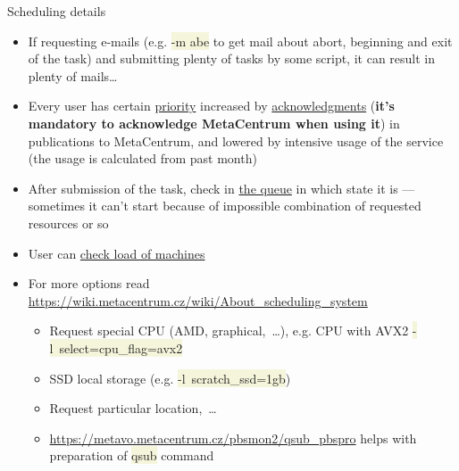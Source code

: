 \documentclass[compress, ucs, xelatex, 11pt, xcolor=svgnames, aspectratio=169,
	hyperref={
		bookmarks=true,
		unicode=true,
		colorlinks=true,
		pdftitle={Linux, command line and MetaCentrum},
		plainpages=false,
		pdfauthor={Vojtech Zeisek},
		pdfsubject={Course about use of Linux command line, writing shell scripts and using MetaCentrum of CESNET},
		pdfcreator={XeLaTeX},
		pdfkeywords={Linux, GNU, BASH, shell, command line, MetaCentrum},
		linkcolor=DarkRed, %
		anchorcolor=DarkBlue, %
		citecolor=Indigo, %
		filecolor=NavyBlue, %
		menucolor=DarkMagenta, %
		urlcolor=DarkBlue, %
		pdftex},
	url={hyphens, lowtilde} %
	]{beamer}
\renewcommand{\texttt}[1]{\colorbox{Beige}{{\ttfamily #1}}}
\begin{document}
\begin{frame}[allowframebreaks]{Scheduling details}
\begin{itemize}
\begin{itemize}
		\end{itemize}
		\item If requesting e-mails (e.g. \texttt{-m abe} to get mail about abort, beginning and exit of the task) and submitting plenty of tasks by some script, it can result in plenty of mails\ldots
		\item Every user has certain \href{https://metavo.metacentrum.cz/pbsmon2/users/}{priority} increased by \href{https://wiki.metacentrum.cz/wiki/Usage_rules/Acknowledgement}{acknowledgments} (\textbf{it's mandatory to acknowledge MetaCentrum when using it}) in publications to MetaCentrum, and lowered by intensive usage of the service (the usage is calculated from past month)
		\item After submission of the task, check in \href{https://metavo.metacentrum.cz/pbsmon2/queues/jobsQueued}{the queue} in which state it is --- sometimes it can't start because of impossible combination of requested resources or so
		\item User can \href{https://metavo.metacentrum.cz/pbsmon2/nodes/physical}{check load of machines}
		\item For more options read \url{https://wiki.metacentrum.cz/wiki/About_scheduling_system}
		\begin{itemize}
			\item Request special CPU (AMD, graphical,~\ldots), e.g. CPU with AVX2 \texttt{-l~select=cpu\_flag=avx2}
			\item SSD local storage (e.g. \texttt{-l~scratch\_ssd=1gb})
			\item Request particular location,~\ldots
			\item \url{https://metavo.metacentrum.cz/pbsmon2/qsub_pbspro} helps with preparation of \texttt{qsub} command
		\end{itemize}
	\end{itemize}
\end{frame}
\end{document}
